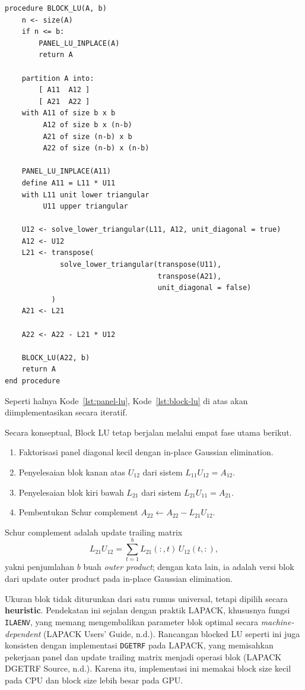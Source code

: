 \documentclass[12pt,a4paper]{article}
\begin{document}
\begin{lstlisting}[style=pseudo,caption={Pseudocode Block LU utama.},label={lst:block-lu}]
procedure BLOCK_LU(A, b)
    n <- size(A)
    if n <= b:
        PANEL_LU_INPLACE(A)
        return A

    partition A into:
        [ A11  A12 ]
        [ A21  A22 ]
    with A11 of size b x b
         A12 of size b x (n-b)
         A21 of size (n-b) x b
         A22 of size (n-b) x (n-b)

    PANEL_LU_INPLACE(A11)
    define A11 = L11 * U11
    with L11 unit lower triangular
         U11 upper triangular

    U12 <- solve_lower_triangular(L11, A12, unit_diagonal = true)
    A12 <- U12
    L21 <- transpose(
             solve_lower_triangular(transpose(U11),
                                    transpose(A21),
                                    unit_diagonal = false)
           )
    A21 <- L21

    A22 <- A22 - L21 * U12

    BLOCK_LU(A22, b)
    return A
end procedure
\end{lstlisting}

Seperti halnya Kode~\ref{lst:panel-lu}, Kode~\ref{lst:block-lu} di atas akan diimplementasikan secara iteratif.

Secara konseptual, Block LU tetap berjalan melalui empat fase utama berikut.
\begin{enumerate}[leftmargin=1.5em]
  \item Faktorisasi panel diagonal kecil dengan in-place Gaussian elimination.
  \item Penyelesaian blok kanan atas $U_{12}$ dari sistem $L_{11}U_{12}=A_{12}$.
  \item Penyelesaian blok kiri bawah $L_{21}$ dari sistem $L_{21}U_{11}=A_{21}$.
  \item Pembentukan Schur complement $A_{22}\leftarrow A_{22}-L_{21}U_{12}$.
\end{enumerate}

Schur complement adalah update trailing matrix
\[
L_{21}U_{12} = \sum_{t=1}^{b} L_{21}(:,t)\,U_{12}(t,:),
\]
yakni penjumlahan $b$ buah \emph{outer product}; dengan kata lain, ia adalah versi blok dari update outer product pada in-place Gaussian elimination.

Ukuran blok tidak diturunkan dari satu rumus universal, tetapi dipilih secara \textbf{heuristic}. Pendekatan ini sejalan dengan praktik LAPACK, khususnya fungsi \texttt{ILAENV}, yang memang mengembalikan parameter blok optimal secara \emph{machine-dependent} (LAPACK Users' Guide, n.d.). Rancangan blocked LU seperti ini juga konsisten dengan implementasi \texttt{DGETRF} pada LAPACK, yang memisahkan pekerjaan panel dan update trailing matrix menjadi operasi blok (LAPACK DGETRF Source, n.d.). Karena itu, implementasi ini memakai block size kecil pada CPU dan block size lebih besar pada GPU.
\end{document}
